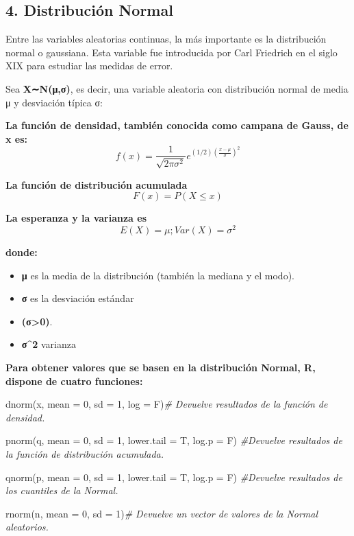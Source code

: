 \documentclass[
]{article}
\newenvironment{Shaded}{\begin{snugshade}}{\end{snugshade}}
\newcommand{\AttributeTok}[1]{\textcolor[rgb]{0.77,0.63,0.00}{#1}}
\newcommand{\CommentTok}[1]{\textcolor[rgb]{0.56,0.35,0.01}{\textit{#1}}}
\newcommand{\DecValTok}[1]{\textcolor[rgb]{0.00,0.00,0.81}{#1}}
\newcommand{\FunctionTok}[1]{\textcolor[rgb]{0.00,0.00,0.00}{#1}}
\newcommand{\NormalTok}[1]{#1}
\begin{document}
\hypertarget{distribuciuxf3n-normal}{%
\subsection{4. Distribución Normal}\label{distribuciuxf3n-normal}}

Entre las variables aleatorias continuas, la más importante es la
distribución normal o gaussiana. Esta variable fue introducida por Carl
Friedrich en el siglo XIX para estudiar las medidas de error.

Sea \textbf{X∼N(μ,σ)}, es decir, una variable aleatoria con distribución
normal de media μ y desviación típica σ: 

\textbf{La función de densidad, también conocida como campana de Gauss,
de x es:}
\[f(x)=\frac{1}{\sqrt{2πσ^{2}}} e^{(1/2)(   \frac{x-μ}{σ})^{2}}\]

\textbf{La función de distribución acumulada} \[F(x)=P(X≤x)\]

\textbf{La esperanza y la varianza es} \[E(X)=μ ; Var(X)=σ^{2}\]

\textbf{donde:}

\begin{itemize}
\item
  \textbf{μ} es la media de la distribución (también la mediana y el
  modo).
\item
  \textbf{σ} es la desviación estándar
\item
  \textbf{(σ\textgreater0)}.
\item
  \textbf{σ\^{}2} varianza
\end{itemize}

\textbf{Para obtener valores que se basen en la distribución Normal, R,
dispone de cuatro funciones:}

\begin{Shaded}
\begin{Highlighting}[]
\FunctionTok{dnorm}\NormalTok{(x, }\AttributeTok{mean =} \DecValTok{0}\NormalTok{, }\AttributeTok{sd =} \DecValTok{1}\NormalTok{, }\AttributeTok{log =}\NormalTok{ F)}\CommentTok{\#    Devuelve resultados de la función de densidad.}

\FunctionTok{pnorm}\NormalTok{(q, }\AttributeTok{mean =} \DecValTok{0}\NormalTok{, }\AttributeTok{sd =} \DecValTok{1}\NormalTok{, }\AttributeTok{lower.tail =}\NormalTok{ T, }\AttributeTok{log.p =}\NormalTok{ F)   }\CommentTok{\#Devuelve resultados de la función de distribución acumulada.}

\FunctionTok{qnorm}\NormalTok{(p, }\AttributeTok{mean =} \DecValTok{0}\NormalTok{, }\AttributeTok{sd =} \DecValTok{1}\NormalTok{, }\AttributeTok{lower.tail =}\NormalTok{ T, }\AttributeTok{log.p =}\NormalTok{ F)   }\CommentTok{\#Devuelve resultados de los cuantiles de la Normal.}

\FunctionTok{rnorm}\NormalTok{(n, }\AttributeTok{mean =} \DecValTok{0}\NormalTok{, }\AttributeTok{sd =} \DecValTok{1}\NormalTok{)}\CommentTok{\# Devuelve un vector de valores de la Normal aleatorios.}
\end{Highlighting}
\end{Shaded}
\end{document}
